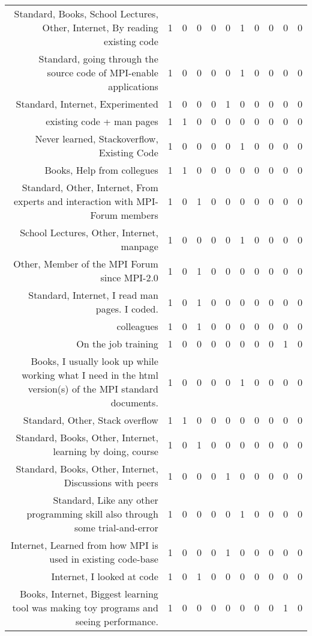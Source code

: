 {\begin{landscape}
\begin{longtable}[htb]{r|c|c|c|c|c|c|c|c|c|c}
{Standard, Books, School Lectures, Other, Internet, By reading existing code} & 1 & 0 & 0 & 0 & 0 & 1 & 0 & 0 & 0 & 0 \\%
{Standard, going through the source code of MPI-enable applications} & 1 & 0 & 0 & 0 & 0 & 1 & 0 & 0 & 0 & 0 \\%
{Standard, Internet, Experimented} & 1 & 0 & 0 & 0 & 1 & 0 & 0 & 0 & 0 & 0 \\%
{existing code + man pages} & 1 & 1 & 0 & 0 & 0 & 0 & 0 & 0 & 0 & 0 \\%
{Never learned, Stackoverflow, Existing Code} & 1 & 0 & 0 & 0 & 0 & 1 & 0 & 0 & 0 & 0 \\%
{Books, Help from collegues} & 1 & 1 & 0 & 0 & 0 & 0 & 0 & 0 & 0 & 0 \\%
{Standard, Other, Internet, From experts and interaction with MPI-Forum members} & 1 & 0 & 1 & 0 & 0 & 0 & 0 & 0 & 0 & 0 \\%
{School Lectures, Other, Internet, manpage} & 1 & 0 & 0 & 0 & 0 & 1 & 0 & 0 & 0 & 0 \\%
{Other, Member of the MPI Forum since MPI-2.0} & 1 & 0 & 1 & 0 & 0 & 0 & 0 & 0 & 0 & 0 \\%
{Standard, Internet, I read man pages. I coded.} & 1 & 0 & 1 & 0 & 0 & 0 & 0 & 0 & 0 & 0 \\%
{colleagues} & 1 & 0 & 1 & 0 & 0 & 0 & 0 & 0 & 0 & 0 \\%
{On the job training} & 1 & 0 & 0 & 0 & 0 & 0 & 0 & 0 & 1 & 0 \\%
{Books, I usually look up while working what I need in the html version(s) of the MPI standard documents.} & 1 & 0 & 0 & 0 & 0 & 1 & 0 & 0 & 0 & 0 \\%
{Standard, Other, Stack overflow} & 1 & 1 & 0 & 0 & 0 & 0 & 0 & 0 & 0 & 0 \\%
{Standard, Books, Other, Internet, learning by doing, course} & 1 & 0 & 1 & 0 & 0 & 0 & 0 & 0 & 0 & 0 \\%
{Standard, Books, Other, Internet, Discussions with peers} & 1 & 0 & 0 & 0 & 1 & 0 & 0 & 0 & 0 & 0 \\%
{Standard, Like any other programming skill also through some trial-and-error} & 1 & 0 & 0 & 0 & 0 & 1 & 0 & 0 & 0 & 0 \\%
{Internet, Learned from how MPI is used in existing code-base} & 1 & 0 & 0 & 0 & 1 & 0 & 0 & 0 & 0 & 0 \\%
{Internet, I looked at code} & 1 & 0 & 1 & 0 & 0 & 0 & 0 & 0 & 0 & 0 \\%
{Books, Internet, Biggest learning tool was making toy programs and seeing performance.} & 1 & 0 & 0 & 0 & 0 & 0 & 0 & 0 & 1 & 0 \\%

\end{longtable}
\end{landscape}}
